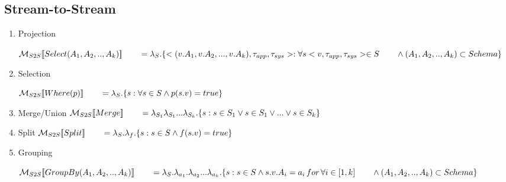 

\subsection*{Stream-to-Stream}
\begin{enumerate}
	\item Projection
	
	$\mathcal{M}_{S2S}[\![Select(A_1,A_2,..,A_k)]\!] \\
		{}\qquad= \lambda_S.\{<(v.A_1,v.A_2,...,v.A_k),\tau_{app},\tau_{sys}>: \forall s<v,\tau_{app},\tau_{sys}>\in S \\
		{}\qquad\land (A_1,A_2,..,A_k) \subset Schema \}$ 
		
	\item Selection
	
	$\mathcal{M}_{S2S}[\![Where(p)]\!] \\
		{}\qquad= \lambda_S.\{s: \forall s \in S  \land p(s.v) = true \}$ 
		
	\item Merge/Union
	$\mathcal{M}_{S2S}[\![Merge]\!] \\
		{}\qquad= \lambda_{S_1}\lambda_{S_1}...\lambda_{S_k}.\{s: s \in S_1 \lor s \in S_1 \lor ... \lor s \in S_k \}$ 
	
	\item Split
	$\mathcal{M}_{S2S}[\![Split]\!] \\
		{}\qquad= \lambda_{S}.\lambda_{f}.\{s: s \in S \land f(s.v) = true \}$ 
	\item Grouping
	
	$\mathcal{M}_{S2S}[\![GroupBy(A_1,A_2,..,A_k)]\!] \\
		{}\qquad= \lambda_S.\lambda_{a_1}.\lambda_{a_2}...\lambda_{a_k}.\{s: s \in S  \land  s.v.A_i= a_i \,for\, \forall i \in [1,k]\\
		{}\qquad\land (A_1,A_2,..,A_k) \subset Schema \}$ 
\end{enumerate}

